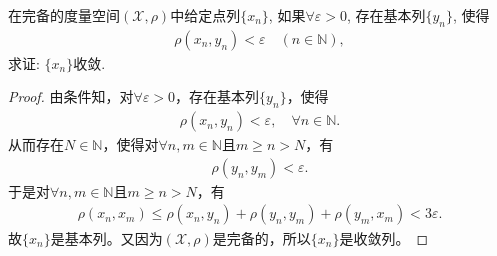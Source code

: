 \documentclass[../../main.tex]{subfiles}%
\begin{document}
\begin{example}
在完备的度量空间$(\mathscr{X},\rho)$中给定点列$\{x_n\}$, 如果$\forall \varepsilon>0$, 存在基本列$\{y_n\}$, 使得
\begin{align*}
\rho(x_n,y_n)<\varepsilon \quad (n\in\mathbb{N}),
\end{align*}
求证: $\{x_n\}$收敛.
\end{example}
\begin{proof}

由条件知，对$\forall \varepsilon>0$，存在基本列$\{y_n\}$，使得
\begin{align*}
\rho(x_n,y_n)<\varepsilon,\quad \forall n\in\mathbb{N}.
\end{align*}
从而存在$N\in\mathbb{N}$，使得对$\forall n,m\in\mathbb{N}$且$m\geqslant n>N$，有
\begin{align*}
\rho(y_n,y_m)<\varepsilon.
\end{align*}
于是对$\forall n,m\in\mathbb{N}$且$m\geqslant n>N$，有
\begin{align*}
\rho(x_n,x_m)\leqslant\rho(x_n,y_n)+\rho(y_n,y_m)+\rho(y_m,x_m)<3\varepsilon.
\end{align*}
故$\{x_n\}$是基本列。又因为$(\mathscr{X},\rho)$是完备的，所以$\{x_n\}$是收敛列。

\end{proof}
\end{document}
